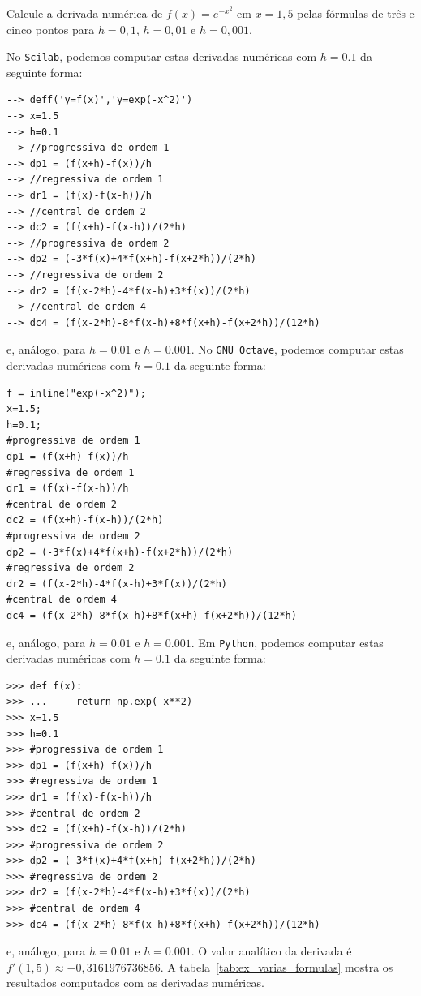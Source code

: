 \begin{ex}\label{ex:varias_formulas}
Calcule a derivada numérica de $f(x)=e^{-x^2}$ em $x=1,5$ pelas fórmulas de três e cinco pontos para $h=0,1$, $h=0,01$ e $h=0,001$.
\end{ex}
\begin{sol}
\ifisscilab
No \verb+Scilab+, podemos computar estas derivadas numéricas com $h=0.1$ da seguinte forma:
\begin{verbatim}
--> deff('y=f(x)','y=exp(-x^2)')
--> x=1.5
--> h=0.1
--> //progressiva de ordem 1
--> dp1 = (f(x+h)-f(x))/h
--> //regressiva de ordem 1
--> dr1 = (f(x)-f(x-h))/h
--> //central de ordem 2
--> dc2 = (f(x+h)-f(x-h))/(2*h)
--> //progressiva de ordem 2
--> dp2 = (-3*f(x)+4*f(x+h)-f(x+2*h))/(2*h)
--> //regressiva de ordem 2
--> dr2 = (f(x-2*h)-4*f(x-h)+3*f(x))/(2*h)
--> //central de ordem 4
--> dc4 = (f(x-2*h)-8*f(x-h)+8*f(x+h)-f(x+2*h))/(12*h)
\end{verbatim}
e, análogo, para $h=0.01$ e $h=0.001$.
\fi
\ifisoctave
No \verb+GNU Octave+, podemos computar estas derivadas numéricas com $h=0.1$ da seguinte forma:
\begin{verbatim}
f = inline("exp(-x^2)");
x=1.5;
h=0.1;
#progressiva de ordem 1
dp1 = (f(x+h)-f(x))/h
#regressiva de ordem 1
dr1 = (f(x)-f(x-h))/h
#central de ordem 2
dc2 = (f(x+h)-f(x-h))/(2*h)
#progressiva de ordem 2
dp2 = (-3*f(x)+4*f(x+h)-f(x+2*h))/(2*h)
#regressiva de ordem 2
dr2 = (f(x-2*h)-4*f(x-h)+3*f(x))/(2*h)
#central de ordem 4
dc4 = (f(x-2*h)-8*f(x-h)+8*f(x+h)-f(x+2*h))/(12*h)
\end{verbatim}
e, análogo, para $h=0.01$ e $h=0.001$.
\fi
\ifispython
Em \verb+Python+, podemos computar estas derivadas numéricas com $h=0.1$ da seguinte forma:
\begin{verbatim}
>>> def f(x):
>>> ...     return np.exp(-x**2)
>>> x=1.5
>>> h=0.1
>>> #progressiva de ordem 1
>>> dp1 = (f(x+h)-f(x))/h
>>> #regressiva de ordem 1
>>> dr1 = (f(x)-f(x-h))/h
>>> #central de ordem 2
>>> dc2 = (f(x+h)-f(x-h))/(2*h)
>>> #progressiva de ordem 2
>>> dp2 = (-3*f(x)+4*f(x+h)-f(x+2*h))/(2*h)
>>> #regressiva de ordem 2
>>> dr2 = (f(x-2*h)-4*f(x-h)+3*f(x))/(2*h)
>>> #central de ordem 4
>>> dc4 = (f(x-2*h)-8*f(x-h)+8*f(x+h)-f(x+2*h))/(12*h)
\end{verbatim}
e, análogo, para $h=0.01$ e $h=0.001$.
\fi
O valor analítico da derivada é $f'(1,5) \approx -0,3161976736856$. A tabela~\ref{tab:ex_varias_formulas} mostra os resultados computados com as derivadas numéricas.


\end{sol}
